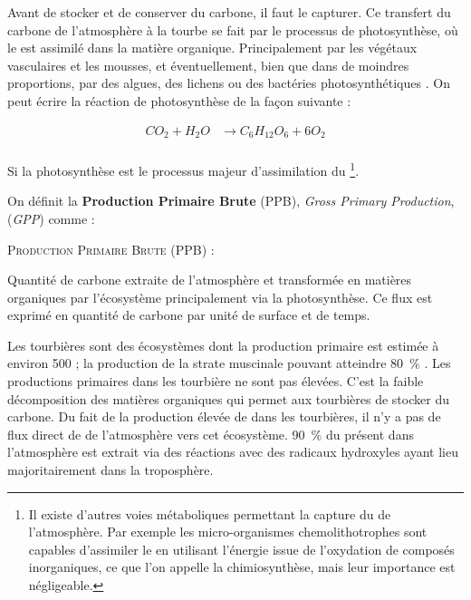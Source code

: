 Avant de stocker et de conserver du carbone, il faut le capturer.
Ce transfert du carbone de l'atmosphère à la tourbe se fait par le processus de photosynthèse, où le \coo est assimilé dans la matière organique.
Principalement par les végétaux vasculaires et les mousses, et éventuellement, bien que dans de moindres proportions, par des algues, des lichens ou des bactéries photosynthétiques \citep{girard2011}.
On peut écrire la réaction de photosynthèse de la façon suivante : 

$$\begin{aligned}
CO_{2} + H_{2}O  & \rightarrow C_{6}H_{12}O_{6} + 6O_{2}\\
\end{aligned} $$

Si la photosynthèse est le processus majeur d'assimilation du \coo \footnote{Il existe d'autres voies métaboliques permettant la capture du \coo de l'atmosphère.
Par exemple les micro-organismes chemolithotrophes sont capables d'assimiler le \coo en utilisant l'énergie issue de l'oxydation de composés inorganiques, ce que l'on appelle la chimiosynthèse, mais leur importance est négligeable.}.

On définit la \textbf{Production Primaire Brute} (PPB), \textit{Gross Primary Production}, (\textit{GPP}) comme :

\begin{pdef}
\textsc{Production Primaire Brute (PPB)} :

Quantité de carbone extraite de l'atmosphère et transformée en matières organiques par l'écosystème principalement via la photosynthèse.
Ce flux est exprimé en quantité de carbone par unité de surface et de temps.
\end{pdef}

Les tourbières sont des écosystèmes dont la production primaire est estimée à environ \SI{500}{\gcm} ;
la production de la strate muscinale pouvant atteindre \SI{80}{\percent} \citep{francez2000}.
Les productions primaires dans les tourbière ne sont pas élevées.
C'est la faible décomposition des matières organiques qui permet aux tourbières de stocker du carbone.
Du fait de la production élevée de \chh dans les tourbières, il n'y a pas de flux direct de \chh de l'atmosphère vers cet écosystème.
\SI{90}{\percent} du \chh présent dans l'atmosphère est extrait via des réactions avec des radicaux hydroxyles ayant lieu majoritairement dans la troposphère.

